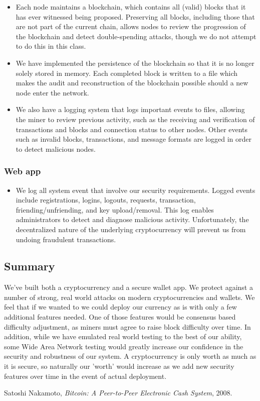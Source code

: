 \documentclass[12pt]{article}
\begin{document}
\begin{itemize}
	\item Each node maintains a blockchain, which contains all (valid) blocks that it has ever witnessed being proposed.
	Preserving all blocks, including those that are not part of the current chain, allows nodes to review the progression of the blockchain and detect double-spending attacks, though we do not attempt to do this in this class.
	\item We have implemented the persistence of the blockchain so that it is no longer solely stored in memory.
	Each completed block is written to a file which makes the audit and reconstruction of the blockchain possible should a new node enter the network.
      \item We also have a logging system that logs important events to files, allowing the miner to review previous activity, such as the receiving and verification of transactions and blocks and connection status to other nodes.
        Other events such as invalid blocks, transactions, and message formats are logged in order to detect malicious nodes.

\end{itemize}

\subsubsection*{Web app}

\begin{itemize}
	\item We log all system event that involve our security requirements.
  Logged events include registrations, logins, logouts, requests, transaction, friending/unfriending, and key upload/removal.
  This log enables administrators to detect and diagnose malicious activity. Unfortunately, the decentralized nature of the underlying cryptocurrency will prevent us from undoing fraudulent transactions.
\end{itemize}

\subsection{Summary}

We've built both a cryptocurrency and a secure wallet app. We protect against a number of strong, real world attacks on modern cryptocurrencies and wallets. We feel that if we wanted to we could deploy our currency as is with only a few additional features needed. One of those features would be consensus based difficulty adjustment, as miners must agree to raise block difficulty over time. In addition, while we have emulated real world testing to the best of our ability, some Wide Area Network testing would greatly increase our confidence in the security and robustness of our system. A cryptocurrency is only worth as much as it is secure, so naturally our 'worth' would increase as we add new security features over time in the event of actual deployment.


\begin{thebibliography}{9}
	Satoshi Nakamoto,
	\emph{Bitcoin: A Peer-to-Peer Electronic Cash System},
	2008.
\end{thebibliography}
\end{document}
